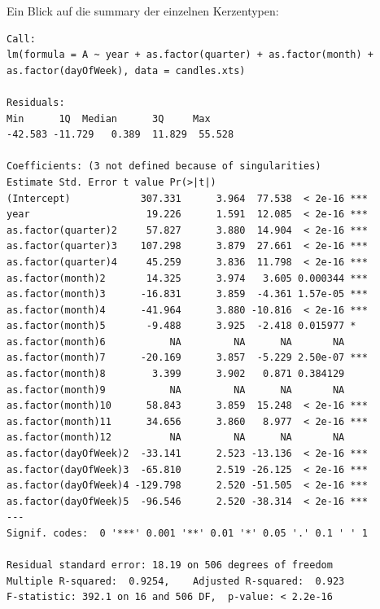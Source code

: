 \documentclass[a4paper,11pt]{article}
\begin{document}
\newpage
Ein Blick auf die summary der einzelnen Kerzentypen:

%
\begin{lstlisting}
Call:
lm(formula = A ~ year + as.factor(quarter) + as.factor(month) + 
as.factor(dayOfWeek), data = candles.xts)

Residuals:
Min      1Q  Median      3Q     Max 
-42.583 -11.729   0.389  11.829  55.528 

Coefficients: (3 not defined because of singularities)
Estimate Std. Error t value Pr(>|t|)    
(Intercept)            307.331      3.964  77.538  < 2e-16 ***
year                    19.226      1.591  12.085  < 2e-16 ***
as.factor(quarter)2     57.827      3.880  14.904  < 2e-16 ***
as.factor(quarter)3    107.298      3.879  27.661  < 2e-16 ***
as.factor(quarter)4     45.259      3.836  11.798  < 2e-16 ***
as.factor(month)2       14.325      3.974   3.605 0.000344 ***
as.factor(month)3      -16.831      3.859  -4.361 1.57e-05 ***
as.factor(month)4      -41.964      3.880 -10.816  < 2e-16 ***
as.factor(month)5       -9.488      3.925  -2.418 0.015977 *  
as.factor(month)6           NA         NA      NA       NA    
as.factor(month)7      -20.169      3.857  -5.229 2.50e-07 ***
as.factor(month)8        3.399      3.902   0.871 0.384129    
as.factor(month)9           NA         NA      NA       NA    
as.factor(month)10      58.843      3.859  15.248  < 2e-16 ***
as.factor(month)11      34.656      3.860   8.977  < 2e-16 ***
as.factor(month)12          NA         NA      NA       NA    
as.factor(dayOfWeek)2  -33.141      2.523 -13.136  < 2e-16 ***
as.factor(dayOfWeek)3  -65.810      2.519 -26.125  < 2e-16 ***
as.factor(dayOfWeek)4 -129.798      2.520 -51.505  < 2e-16 ***
as.factor(dayOfWeek)5  -96.546      2.520 -38.314  < 2e-16 ***
---
Signif. codes:  0 '***' 0.001 '**' 0.01 '*' 0.05 '.' 0.1 ' ' 1

Residual standard error: 18.19 on 506 degrees of freedom
Multiple R-squared:  0.9254,	Adjusted R-squared:  0.923 
F-statistic: 392.1 on 16 and 506 DF,  p-value: < 2.2e-16
\end{lstlisting}
\end{document}
